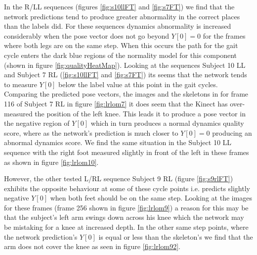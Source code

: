 \documentclass[11pt]{article} %
\begin{document}
In the R/LL sequences (figures \ref{fig:s10llFT} and \ref{fig:s7FT}) we find that the network predictions tend to produce greater abnormality in the correct places than the labels did. For these sequences dynamics abnormality is increased considerably when the pose vector does not go beyond $Y[0]=0$ for the frames where both legs are on the same step. When this occurs the path for the gait cycle enters the dark blue regions of the normality model for this component (shown in figure \ref{fig:qualityHeatMap}). Looking at the sequences Subject 10 LL and Subject 7 RL (\ref{fig:s10llFT} and \ref{fig:s7FT}) its seems that the network tends to measure $Y[0]$ below the label value at this point in the gait cycles. Comparing the predicted pose vectors, the images and the skeletons in for frame 116 of Subject 7 RL in figure \ref{fig:lrlom7} it does seem that the Kinect has over-measured the position of the left knee. This leads it to produce a pose vector in the negative region of $Y[0]$ which in turn produces a normal dynamics quality score, where as the network's prediction is much closer to $Y[0]=0$ producing an abnormal dynamics score. We find the same situation in the Subject 10 LL sequence with the right foot measured slightly in front of the left in these frames as shown in figure \ref{fig:lrlom10}. 

However, the other tested L/RL sequence Subject 9 RL (figure \ref{fig:s9rlFT}) exhibits the opposite behaviour at some of these cycle points i.e. predicts slightly negative $Y[0]$ when both feet should be on the same step. Looking at the images for these frames (frame 256 shown in figure \ref{fig:lrlom9}) a reason for this may be that the subject's left arm swings down across his knee which the network may be mistaking for a knee at increased depth. In the other same step points, where the network prediction's $Y[0]$ is equal or less than the skeleton's we find that the arm does not cover the knee as seen in figure \ref{fig:lrlom92}.
 
\end{document}

